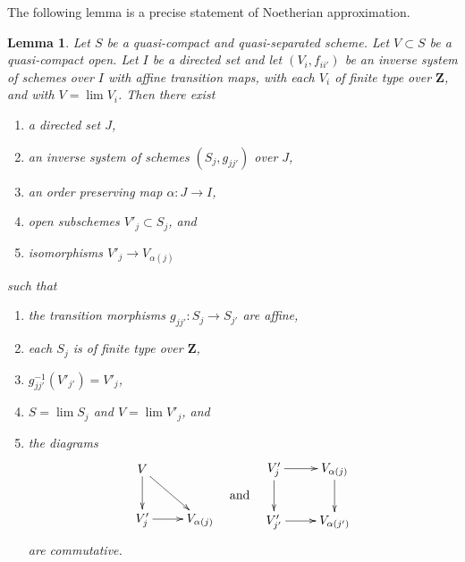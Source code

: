 \documentclass{stacks-project}
\theoremstyle{plain}
\newtheorem{lemma}[subsection]{Lemma}
\theoremstyle{definition}
\theoremstyle{remark}
\numberwithin{equation}{subsection}
\def\lim{\mathop{\mathrm{lim}}\nolimits}
\begin{document}
\noindent
The following lemma is a precise statement of Noetherian
approximation.

\begin{lemma}
\label{lemma-approximate}
Let $S$ be a quasi-compact and quasi-separated scheme. Let $V \subset S$
be a quasi-compact open. Let $I$ be a directed set
and let $(V_i, f_{ii'})$ be an inverse system of schemes over $I$
with affine transition maps, with each $V_i$ of finite type over $\mathbf{Z}$,
and with $V = \lim V_i$. Then there exist
\begin{enumerate}
\item a directed set $J$,
\item an inverse system of schemes $(S_j, g_{jj'})$ over $J$,
\item an order preserving map $\alpha : J \to I$,
\item open subschemes $V'_j \subset S_j$, and
\item isomorphisms $V'_j \to V_{\alpha(j)}$
\end{enumerate}
such that
\begin{enumerate}
\item the transition morphisms $g_{jj'} : S_j \to S_{j'}$ are affine,
\item each $S_j$ is of finite type over $\mathbf{Z}$,
\item $g_{jj'}^{-1}(V'_{j'}) = V'_j$,
\item $S = \lim S_j$ and $V = \lim V'_j$, and
\item the diagrams
$$
\vcenter{
\xymatrix{
V \ar[d] \ar[rd] \\
V'_j \ar[r] & V_{\alpha(j)}
}
}
\quad\text{and}\quad
\vcenter{
\xymatrix{
V'_j \ar[r] \ar[d] & V_{\alpha(j)} \ar[d] \\
V'_{j'} \ar[r] & V_{\alpha(j')}
}
}
$$
are commutative.
\end{enumerate}
\end{lemma}
\end{document}
